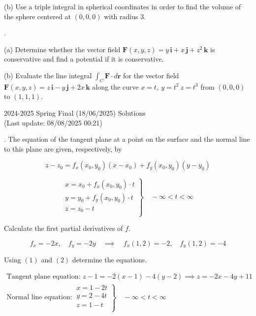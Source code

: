 \documentclass{article}
\begin{document}
\hfill

\noindent (b) Use a triple integral in spherical coordinates in order to find the volume of the sphere centered at $(0,0,0)$ with radius $3$.

\hfill

.

\hfill

\noindent (a) Determine whether the vector field $\mathbf{F}(x,y,z)=y\,\mathbf{i}+x\,\mathbf{j}+z^2\,\mathbf{k}$ is conservative and find a potential if it is conservative.

\hfill

\noindent (b) Evaluate the line integral $\int_C\mathbf{F}\cdot d\mathbf{r}$ for the vector field $\mathbf{F}(x,y,z)=z\,\mathbf{i}-y\,\mathbf{j}+2x\,\mathbf{k}$ along the curve $x=t,\:y=t^2\:z=t^3$ from $(0,0,0)$ to $(1,1,1)$.

\newpage

\begin{center}
2024-2025 Spring Final (18/06/2025) Solutions\\
(Last update: 08/08/2025 00:21)
\end{center}

. The equation of the tangent plane at a point on the surface and the normal line to this plane are given, respectively, by

\begin{equation}z-z_0=f_x(x_0,y_0)(x-x_0)+f_y(x_0,y_0)(y-y_0)\end{equation}

\begin{equation}
\left.\begin{array}{c}
x=x_0+f_x(x_0,y_0)\cdot t\\
y=y_0+f_y(x_0,y_0)\cdot t\\
z=z_0- t\\
\end{array}\right\}\quad-\infty<t<\infty
\end{equation}

\hfill

\noindent Calculate the first partial derivatives of $f$.

\[f_x=-2x,\quad f_y=-2y\quad\implies\quad f_x(1,2)=-2,\quad f_y(1,2)=-4\]

\hfill

\noindent Using $(1)$ and $(2)$ determine the equations.

\[\boxed{\begin{array}{l}
\text{Tangent plane equation: } z-1=-2(x-1)-4(y-2)\implies z=-2x-4y+11\\[1em]
\text{Normal line equation:}\:\left.\begin{array}{l}
x=1-2t\\
y=2-4t\\
z=1-t\\
\end{array}\right\}\quad-\infty<t<\infty
\end{array}
}
\]
\end{document}
